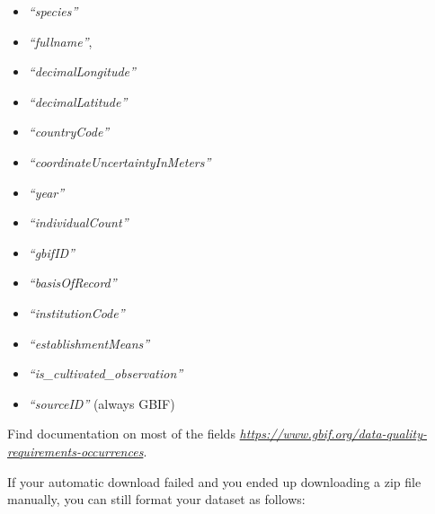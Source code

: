 \documentclass[
]{article}
\begin{document}
\begin{itemize}
\item
  \emph{``species''}
\item
  \emph{``fullname''},
\item
  \emph{``decimalLongitude''}
\item
  \emph{``decimalLatitude''}
\item
  \emph{``countryCode''}
\item
  \emph{``coordinateUncertaintyInMeters''}
\item
  \emph{``year''}
\item
  \emph{``individualCount''}
\item
  \emph{``gbifID''}
\item
  \emph{``basisOfRecord''}
\item
  \emph{``institutionCode''}
\item
  \emph{``establishmentMeans''}
\item
  \emph{``is\_cultivated\_observation''}
\item
  \emph{``sourceID''} (always GBIF)
\end{itemize}

Find documentation on most of the fields
\href{https://www.gbif.org/data-quality-requirements-occurrences}{\emph{https://www.gbif.org/data-quality-requirements-occurrences}}.

If your automatic download failed and you ended up downloading a zip
file manually, you can still format your dataset as follows:
\end{document}

